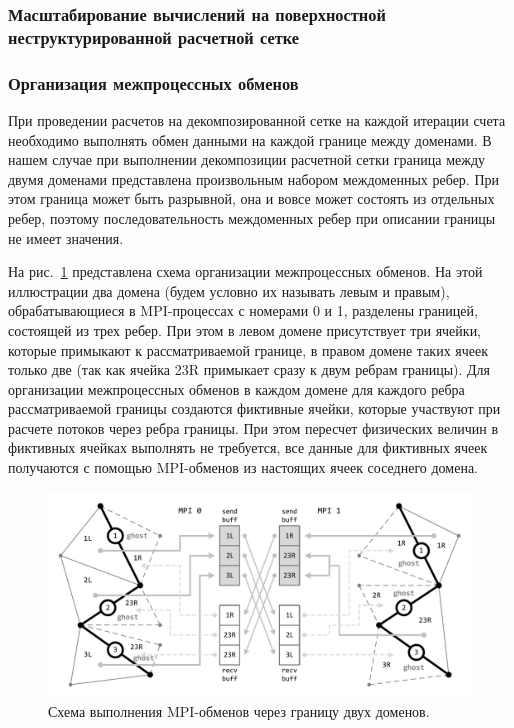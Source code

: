 \subsubsection{Масштабирование вычислений на поверхностной \\ неструктурированной расчетной сетке}

\subsubsection{Организация межпроцессных обменов}

При проведении расчетов на декомпозированной сетке на каждой итерации счета необходимо выполнять обмен данными на каждой границе между доменами.
В нашем случае при выполнении декомпозиции расчетной сетки граница между двумя доменами представлена произвольным набором междоменных ребер\label{term:edge_cross4}.
При этом граница может быть разрывной, она и вовсе может состоять из отдельных ребер, поэтому последовательность междоменных ребер при описании границы не имеет значения.

На рис.~\ref{fig:text_2_scaling_mpi} представлена схема организации межпроцессных обменов.
На этой иллюстрации два домена (будем условно их называть левым и правым), обрабатывающиеся в MPI-процессах\label{abbr:mpi3} с номерами 0 и 1, разделены границей, состоящей из трех ребер.
При этом в левом домене присутствует три ячейки, которые примыкают к рассматриваемой границе, в правом домене таких ячеек только две (так как ячейка 23R примыкает сразу к двум ребрам границы).
Для организации межпроцессных обменов в каждом домене для каждого ребра рассматриваемой границы создаются фиктивные ячейки, которые участвуют при расчете потоков через ребра границы.
При этом пересчет физических величин в фиктивных ячейках выполнять не требуется, все данные для фиктивных ячеек\label{term:cell_block_ghost2} получаются с помощью MPI-обменов из настоящих ячеек соседнего домена.

\begin{figure}[ht]
\centering
\includegraphics[width=1.0\textwidth]{pics/text_2_scaling/mpi.pdf}
\singlespacing
{}\caption{Схема выполнения MPI-обменов через границу двух доменов.}\label{fig:text_2_scaling_mpi}
\end{figure}

